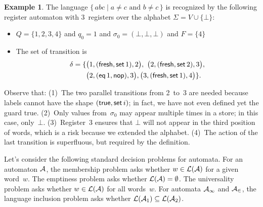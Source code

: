 \documentclass[9pt, preprint]{sigplanconf} %
\theoremstyle{definition}
\newtheorem{example}{Example}
\theoremstyle{remark}
\begin{document}
\begin{example}\label{ex:ra1}
The language $\{\,abc\mid\text{$a\ne c$ and $b\ne c$}\,\}$ is recognized by the following register automaton with $3$~registers over the alphabet $\Sigma=V\cup\{\bot\}$:
\begin{itemize}
\item $Q=\{1,2,3,4\}$
  and $q_0=1$
  and $\sigma_0=(\bot,\bot,\bot)$
  and $F=\{4\}$
\item The set of transition is
\begin{align*}\delta =\{ & \bigl(1,({\sf fresh},{\sf set}\,1),2\bigr), \ \bigl(2,({\sf fresh},{\sf set}\,2),3\bigr), \\
& \bigl(2,({\sf eq}\,1,{\sf nop}),3\bigr), \bigl(3,({\sf fresh},{\sf set}\,1),4\bigr) \}.
\end{align*}
\end{itemize}
Observe that:
(1)~The two parallel transitions from 2~to~3 are needed because labels cannot have the shape $({\sf true},{\sf set}\,i)$; in fact, we have not even defined yet the guard {\sf true}.
(2)~Only values from~$\sigma_0$ may appear multiple times in a store; in this case, only~$\bot$.
(3)~Register~3 ensures that $\bot$ will not appear in the third position of words, which is a risk because we extended the alphabet.
(4)~The action of the last transition is superfluous, but required by the definition.
\end{example}

Let's consider the following  standard decision problems for automata. For an automaton ${\cal A}$,
the membership problem asks whether $w\in {\cal L}({\cal A})$ for a given word~$w$.
The emptiness problem asks whether ${\cal L}({\cal A}) = \emptyset$.
The  universality problem asks whether $w\in{\cal L}({\cal A})$ for all words~$w$.
For automata ${\cal A_1}$ and ${\cal A_2}$, the  language inclusion problem asks whether ${\cal L}({\cal A}_1) \subseteq {\cal L}({\cal A}_2)$.
\end{document}
